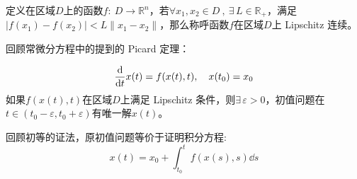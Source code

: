 \begin{definition}[Lipschitz 连续]\label{definition:Lipschitz}
定义在区域$D$上的函数$f: \ D \to \mathbb{R}^n$，若$\forall x_1,x_2 \in D \ , \ \exists \, L \in \mathbb{R}_+$，满足$|f(x_1)-f(x_2)|<L\|x_1-x_2\|$，那么称呼函数$f$在区域$D$上 Lipschitz 连续。
\end{definition}
回顾常微分方程中的提到的 Picard 定理：
\begin{proposition}[Picard 定理]
\begin{equation}\label{eq:dquestion}
\dv{}{t}x(t)=f(x(t),t), \quad x(t_0)=x_0
\end{equation}
如果$f(x(t),t)$在区域$D$上满足 Lipschitz 条件，则$\exists \, \varepsilon > 0$，初值问题在$t \in (t_0-\varepsilon,t_0+\varepsilon)$有唯一解$x(t)$。
\end{proposition}

回顾初等的证法，原初值问题等价于证明积分方程:
\begin{equation}\label{eq:iquestion}
x(t)=x_0+\int_{t_0}^tf(x(s),s)\dd s
\end{equation}

